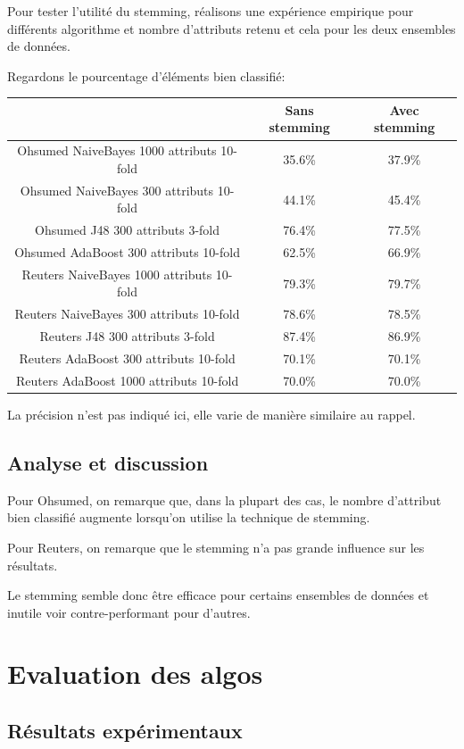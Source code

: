 \documentclass[a4paper,10pt]{article}
\begin{document}
Pour tester l'utilité du stemming, réalisons une expérience empirique pour différents algorithme et nombre d'attributs retenu et cela pour les deux ensembles de données.

Regardons le pourcentage d'éléments bien classifié:
\begin{center}
\begin{tabular}{ |c|c|c| } 
 \hline
  & Sans stemming & Avec stemming \\ 
 \hline
 Ohsumed NaiveBayes 1000 attributs 10-fold  & 35.6\% & 37.9\% \\ 
 Ohsumed NaiveBayes 300 attributs 10-fold  & 44.1\% & 45.4\% \\ 
 Ohsumed J48 300 attributs 3-fold & 76.4\% & 77.5\% \\ 
 Ohsumed AdaBoost 300 attributs 10-fold & 62.5\% & 66.9\% \\
 \hline
 Reuters NaiveBayes 1000 attributs 10-fold & 79.3\% & 79.7\% \\
 Reuters NaiveBayes 300 attributs 10-fold  & 78.6\% & 78.5\% \\ 
 Reuters J48 300 attributs 3-fold & 87.4\% & 86.9\% \\ 
 Reuters AdaBoost 300 attributs 10-fold & 70.1\% & 70.1\% \\ 
 Reuters AdaBoost 1000 attributs 10-fold & 70.0\% & 70.0\% \\ 
 \hline
\end{tabular}
\end{center}
La précision n'est pas indiqué ici, elle varie de manière similaire au rappel.

\subsection{Analyse et discussion}
Pour Ohsumed, on remarque que, dans la plupart des cas, le nombre d'attribut bien classifié augmente lorsqu'on utilise la technique de stemming. 

Pour Reuters, on remarque que le stemming n'a pas grande influence sur les résultats.

Le stemming semble donc être efficace pour certains ensembles de données et inutile voir contre-performant pour d'autres. 

\section{Evaluation des algos}

\subsection{Résultats expérimentaux}
\end{document}
